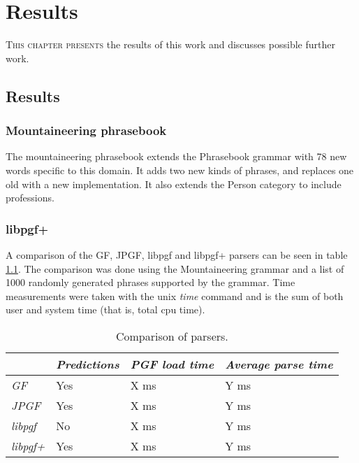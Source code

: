 \chapter{Results}
\lettrine[lines=4, loversize=-0.1, lraise=0.1]{T}{his chapter presents} the results of this work and discusses possible further work.


\section{Results}


\subsection{Mountaineering phrasebook}
The mountaineering phrasebook extends the Phrasebook grammar with 78 new words specific to this domain. It adds two new kinds of phrases, and replaces one old with a new implementation. It also extends the Person category to include professions.


\subsection{libpgf+}
A comparison of the GF, JPGF, libpgf and libpgf+ parsers can be seen in table \ref{tbl:parsercomparison}. The comparison was done using the Mountaineering grammar and a list of 1000 randomly generated phrases supported by the grammar. Time measurements were taken with the unix \emph{time} command and is the sum of both user and system time (that is, total cpu time).

\begin{table}
\begin{center}
\begin{tabular}{|l|l|l|l|}
	\hline
	 & \emph{Predictions} & \emph{PGF load time} & \emph{Average parse time} \\ \hline
	\emph{GF} & Yes & X ms & Y ms \\ \hline
	\emph{JPGF} & Yes & X ms & Y ms \\ \hline
	\emph{libpgf} & No & X ms & Y ms \\ \hline
	\emph{libpgf+} & Yes & X ms & Y ms \\ \hline
\end{tabular}
\end{center}
\caption{Comparison of parsers.}
\label{tbl:parsercomparison}
\end{table}


